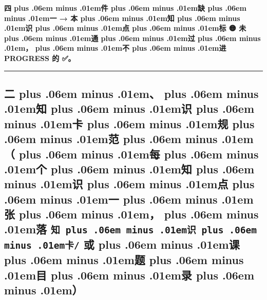 \documentclass[
]{article}
\providecommand{\texorpdfstring}[2]{#1}   %
\def\zh#1{{\zhfont #1}}
\def\sym#1{{\symfont #1}}
\def\emo#1{{\emofont #1}}
\def\zhglue{\hskip0pt plus .06em minus .01em}
\begin{document}
\textbf{\zh{四\zhglue 件\zhglue 缺\zhglue 一} \sym{→} \zh{本\zhglue 知\zhglue 识\zhglue 点\zhglue 标} \emo{🟡} \zh{未\zhglue 通\zhglue 过\zhglue ，\zhglue 不\zhglue 进} PROGRESS \zh{的} \emo{✅}\zh{。}}

\begin{center}\rule{0.5\linewidth}{0.5pt}\end{center}

\subsection{\texorpdfstring{\zh{二\zhglue 、\zhglue 知\zhglue 识\zhglue 卡\zhglue 规\zhglue 范\zhglue （\zhglue 每\zhglue 个\zhglue 知\zhglue 识\zhglue 点\zhglue 一\zhglue 张\zhglue ，\zhglue 落} \texttt{\zh{知\zhglue 识\zhglue 卡}/} \zh{或\zhglue 课\zhglue 题\zhglue 目\zhglue 录\zhglue ）}}{\zh{二\zhglue 、\zhglue 知\zhglue 识\zhglue 卡\zhglue 规\zhglue 范\zhglue （\zhglue 每\zhglue 个\zhglue 知\zhglue 识\zhglue 点\zhglue 一\zhglue 张\zhglue ，\zhglue 落} \zh{知\zhglue 识\zhglue 卡}/ \zh{或\zhglue 课\zhglue 题\zhglue 目\zhglue 录\zhglue ）}}}\label{ux4e8cux77e5ux8bc6ux5361ux89c4ux8303ux6bcfux4e2aux77e5ux8bc6ux70b9ux4e00ux5f20ux843d-ux77e5ux8bc6ux5361-ux6216ux8bfeux9898ux76eeux5f55}
\end{document}
